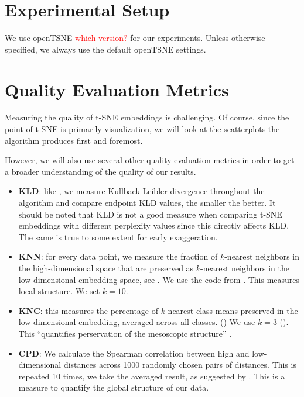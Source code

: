 \section{Experimental Setup}
We use openTSNE \textcolor{red}{which version?} for our experiments. Unless otherwise specified, we always use the default openTSNE settings.

\section{Quality Evaluation Metrics}
Measuring the quality of t-SNE embeddings is challenging. 
Of course, since the point of t-SNE is primarily visualization, we will look at the scatterplots the algorithm produces first and foremost. 

However, we will also use several other quality evaluation metrics in order to get a broader understanding of the quality of our results. 
\begin{itemize}
    \item \textbf{KLD}: like \cite{belkina19}, we measure Kullback Leibler divergence throughout the algorithm and compare endpoint KLD values, the smaller the better. 
    It should be noted that KLD is not a good measure when comparing t-SNE embeddings with different perplexity values since this directly affects KLD. 
    The same is true to some extent for early exaggeration.  
    \item \textbf{KNN}: for every data point, we measure the fraction of $k$-nearest neighbors in the high-di\-mension\-al space that are preserved as $k$-nearest neighbors in the low-di\-men\-sio\-nal embedding space, see \cite{KoBe19SingleCell}. 
    We use the code from . 
    This measures local structure. 
    We set $k=10$. 
    \item \textbf{KNC}: this measures the percentage of $k$-nearest class means preserved in the low-dimensional embedding, averaged across all classes. ()
    We use $k=3$ (). 
    This \enquote{quantifies perservation of the mesoscopic structure} \cite{KoBe19SingleCell}. 
    \item \textbf{CPD}: We calculate the Spearman correlation between high and low-dimensional distances across 1000 randomly chosen pairs of distances. This is repeated 10 times, we take the averaged result, as suggested by . This is a measure to quantify the global structure of our data. 
\end{itemize}


